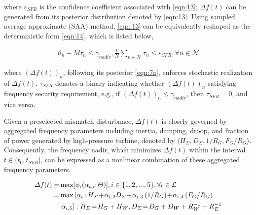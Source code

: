 \documentclass[lettersize,journal]{IEEEtran}
\begin{document}

\noindent where $\varepsilon_{SFR}$ is the confidence coefficient associated with \eqref{eqn:13}; \(\varDelta f(t)\) can be generated from its posterior distribution denoted by \eqref{eqn:13}. Using
sampled average approximate (SAA) method, \eqref{eqn:13} can be equivalently reshaped as the deterministic form \eqref{eqn:14}, which is listed below,

\vspace{-0.125in}
	\begin{small} \begin{align}
		\vartheta_{n} - M\tau_{n}\! \leq \!\gamma_{nadir}, \frac{1}{{N}}\sum\nolimits_{n\in\mathcal{N}}  \tau_{n} \leq \varepsilon_{SFR},\forall n \in \mathcal{N} \label{eqn:14}
	\end{align}
\end{small}

\vspace{-0.025in}
\noindent where \((\varDelta f(t))_{n}\), following its posterior \eqref{eqn:7a}, enforces stochastic realization of \(\varDelta f(t)\). \(\tau_{SFR}\) denotes a binary indicating whether \((\varDelta f(t))_{n}\) satisfying frequency security requirement, e.g., if \((\varDelta f (t))_{n}\!\leq\! \gamma_{nadir}\), then \(\tau_{SFR}\!=\!0\), and vice versa.

Given a preselected mismatch disturbance, \(\varDelta f(t)\) is closely governed by aggregated frequency parameters including inertia, damping, droop, and fraction of power generated by high-pressure turbine, denoted by \(\langle H_{\varSigma}, D_{\varSigma}, 1/R_{G},F_{G}/R_{G}\rangle\). Consequently, the frequency nadir, which minimizes \(\varDelta f(t)\) within the interval \(t\in(t_{0},t_{SFR}]\), can be expressed as a nonlinear combination of these aggregated frequency parameters,

\vspace{-0.125in} 
\begin{small} \begin{align}
	\varDelta  f(t) =& \max[\phi_{\iota}(\alpha_{\iota, i}; \varTheta)],i\in\{1,2,...,5\},\forall \iota\in\mathcal{L} \label{eqn:15} \\
			=&\max\left[\alpha_{\iota,1} H_{\varSigma} \!+\!\alpha_{\iota,2}
D_{\varSigma} \!+\! \alpha_{\iota,3} \left({1}/{R_{G}}\right)\!+\!\alpha_{\iota,4} \left({F_{G}}/{R_{G}}\right)\right.\notag \\
& \left. \alpha_{\iota,5}\right]:H_{\varSigma} \!=\! H_{G} + H_{W}, D_{\varSigma} \!=\! D_{G}+D_{W}+{ R_{W}^{-1} } + { R_{E}^{-1}} \notag 
\end{align} \end{small}
\end{document}
